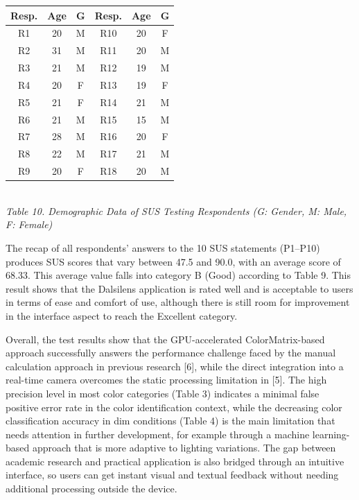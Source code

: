 \begin{table}[H]
  \centering
  {\footnotesize
  \begin{tabular}{|c|c|c||c|c|c|}
    \hline
    \textbf{Resp.} & \textbf{Age} & \textbf{G} & \textbf{Resp.} & \textbf{Age} & \textbf{G} \\\hline
    R1  & 20 & M & R10 & 20 & F \\ \hline
    R2  & 31 & M & R11 & 20 & M \\ \hline
    R3  & 21 & M & R12 & 19 & M \\ \hline
    R4  & 20 & F & R13 & 19 & F \\ \hline
    R5  & 21 & F & R14 & 21 & M \\ \hline
    R6  & 21 & M & R15 & 15 & M \\ \hline
    R7  & 28 & M & R16 & 20 & F \\ \hline
    R8  & 22 & M & R17 & 21 & M \\ \hline
    R9  & 20 & F & R18 & 20 & M \\ \hline
  \end{tabular}}\\[0.3em]
  {\footnotesize\textit{Table 10. Demographic Data of SUS Testing Respondents (G: Gender, M: Male, F: Female)}}
\end{table}

The recap of all respondents' answers to the 10 SUS statements (P1--P10) produces SUS scores that vary between 47.5 and 90.0, with an average score of 68.33. This average value falls into category B (Good) according to Table 9. This result shows that the Dalsilens application is rated well and is acceptable to users in terms of ease and comfort of use, although there is still room for improvement in the interface aspect to reach the Excellent category.

Overall, the test results show that the GPU-accelerated ColorMatrix-based approach successfully answers the performance challenge faced by the manual calculation approach in previous research [6], while the direct integration into a real-time camera overcomes the static processing limitation in [5]. The high precision level in most color categories (Table 3) indicates a minimal false positive error rate in the color identification context, while the decreasing color classification accuracy in dim conditions (Table 4) is the main limitation that needs attention in further development, for example through a machine learning-based approach that is more adaptive to lighting variations. The gap between academic research and practical application is also bridged through an intuitive interface, so users can get instant visual and textual feedback without needing additional processing outside the device.

